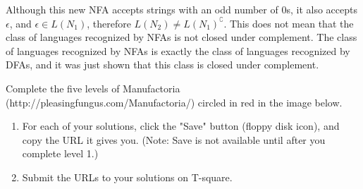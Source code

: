 \documentclass[10pt, legalpaper]{exam}
\begin{document}
\begin{questions}
\begin{enumerate}[(a)]
\begin{center}
    \end{center}
    
    Although this new NFA accepts strings with an odd number of 0s, it also accepts \(\epsilon\), and \(\epsilon \in L(N_{1})\), therefore \(L(N_{2}) \neq L(N_{1})^{\complement}\). This does not mean that the class of languages recognized by NFAs is not closed under complement. The class of languages recognized by NFAs is exactly the class of languages recognized by DFAs, and it was just shown that this class is closed under complement.
\end{enumerate}

\newpage
\addpoints
\question[25] Complete the five levels of Manufactoria (http://pleasingfungus.com/Manufactoria/) circled in red in the image below.
\begin{enumerate}
\item For each of your solutions, click the "Save" button (floppy disk icon), and copy the URL it gives you. (Note: Save is not available until after you complete level 1.)

\item Submit the URLs to your solutions on T-square.


\end{enumerate}
\end{questions}
\end{document}
